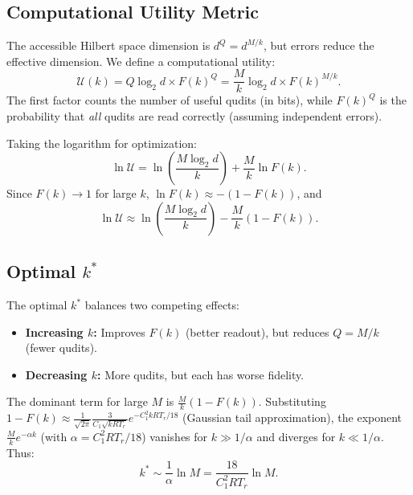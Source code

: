 \documentclass[11pt,letterpaper]{article}
\begin{document}
\subsection{Computational Utility Metric}

The accessible Hilbert space dimension is $d^Q = d^{M/k}$, but errors
reduce the effective dimension.  We define a computational utility:
\begin{equation}
  \mathcal{U}(k) = Q \log_2 d \times F(k)^Q
  = \frac{M}{k} \log_2 d \times F(k)^{M/k}.
  \label{eq:utility}
\end{equation}
The first factor counts the number of useful qudits (in bits), while
$F(k)^Q$ is the probability that \emph{all} qudits are read correctly
(assuming independent errors).

Taking the logarithm for optimization:
\begin{equation}
  \ln \mathcal{U} = \ln\!\left(\frac{M \log_2 d}{k}\right)
  + \frac{M}{k} \ln F(k).
\end{equation}
Since $F(k) \to 1$ for large $k$, $\ln F(k) \approx -(1-F(k))$, and
\begin{equation}
  \ln \mathcal{U} \approx \ln\!\left(\frac{M \log_2 d}{k}\right)
  - \frac{M}{k} (1 - F(k)).
\end{equation}

\subsection{Optimal $k^*$}

The optimal $k^*$ balances two competing effects:
\begin{itemize}
  \item \textbf{Increasing $k$:} Improves $F(k)$ (better readout), but
    reduces $Q = M/k$ (fewer qudits).
  \item \textbf{Decreasing $k$:} More qudits, but each has worse fidelity.
\end{itemize}

The dominant term for large $M$ is $\frac{M}{k}(1 - F(k))$.  Substituting
$1 - F(k) \approx \frac{1}{\sqrt{2\pi}} \frac{3}{C_1 \sqrt{k R T_r}} e^{-C_1^2 k R T_r / 18}$
(Gaussian tail approximation), the exponent $\frac{M}{k} e^{-\alpha k}$
(with $\alpha = C_1^2 R T_r / 18$) vanishes for $k \gg 1/\alpha$ and
diverges for $k \ll 1/\alpha$.  Thus:
\begin{equation}
  \boxed{k^* \sim \frac{1}{\alpha} \ln M
  = \frac{18}{C_1^2 R T_r} \ln M.}
  \label{eq:kstar}
\end{equation}
\end{document}
